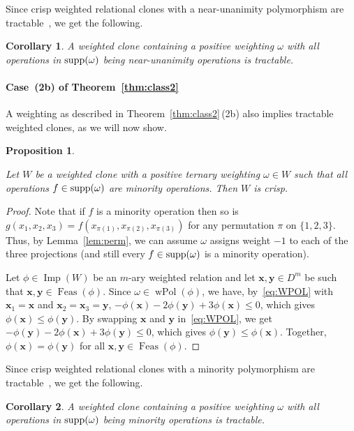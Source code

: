 \documentclass[11pt, reqno]{article}
\DeclareMathOperator{\wpol}{wPol}
\newcommand{\tup}[1]{\ensuremath{\mathbf #1}}
\DeclareMathOperator{\supp}{{\rm supp}}
\DeclareMathOperator{\dom}{{Feas}}
\DeclareMathOperator{\imp}{Imp}
\newtheorem{proposition}[theorem]{Proposition}
\newtheorem{corollary}{Corollary}
\theoremstyle{remark}
\begin{document}
Since crisp weighted relational clones with a near-unanimity polymorphism 
are tractable~\cite{Jeavons97:closure}, we get
the following.

\begin{corollary}
A weighted clone containing a positive weighting $\omega$ with all operations in
$\supp(\omega)$ being near-unanimity operations is tractable.
\end{corollary}

\paragraph{Case~(2b) of Theorem~\ref{thm:class2}}

A weighting as described in Theorem~\ref{thm:class2}\,(2b) also implies tractable
weighted clones, as we will now show.

\begin{proposition}\label{prop:minority}

Let $W$ be a weighted clone with a positive ternary weighting $\omega\in W$ such that all
operations $f\in\supp(\omega)$ are minority operations. Then $W$ is crisp.

\end{proposition}

\begin{proof}
Note that if $f$ is a minority operation
then so is $g(x_1,x_2,x_3)=f(x_{\pi(1)},x_{\pi(2)},x_{\pi(3)})$ for any
permutation $\pi$ on $\{1,2,3\}$. Thus, by Lemma~\ref{lem:perm}, we can
assume $\omega$ assigns weight $-1$ to each of the three projections (and still every
$f\in\supp(\omega)$ is a minority operation).

Let $\phi\in\imp(W)$ be an $m$-ary weighted relation and let
$\tup{x},\tup{y}\in D^m$ be such that $\tup{x},\tup{y}\in\dom(\phi)$. 
%
Since $\omega\in\wpol(\phi)$, we have, by~\eqref{eq:WPOL} with
$\tup{x}_1=\tup{x}$ and $\tup{x}_2=\tup{x}_3=\tup{y}$,
%
$-\phi(\tup{x})-2\phi(\tup{y})+3\phi(\tup{x})\leq 0$, which gives $\phi(\tup{x})\leq\phi(\tup{y})$. By swapping
$\tup{x}$ and $\tup{y}$ in~\eqref{eq:WPOL}, we get
$-\phi(\tup{y})-2\phi(\tup{x})+3\phi(\tup{y})\leq 0$, which gives
$\phi(\tup{y})\leq\phi(\tup{x})$. Together, $\phi(\tup{x})=\phi(\tup{y})$ for all
$\tup{x},\tup{y}\in\dom(\phi)$. 
%
\end{proof}

Since crisp weighted relational clones with a minority polymorphism are
tractable~\cite{Jeavons97:closure}, we get the following.


\begin{corollary}
A weighted clone containing a positive weighting $\omega$ with all operations in
$\supp(\omega)$ being minority operations is tractable.
\end{corollary}
\end{document}
